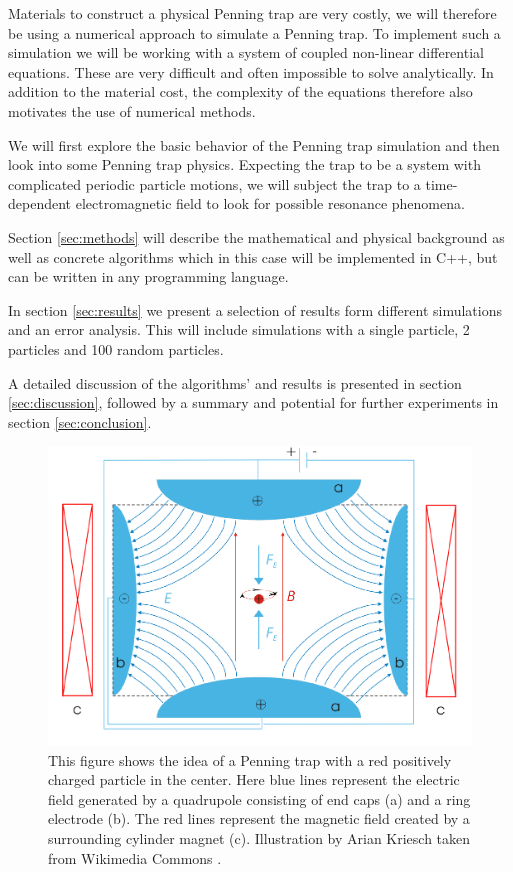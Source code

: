 \documentclass[english,notitlepage,reprint,nofootinbib]{revtex4-1}  %
\begin{document}
Materials to construct a physical Penning trap are very costly, we will therefore
be using a numerical approach to simulate a Penning trap. To implement such a simulation
we will be working with a system of coupled non-linear differential equations. These are very
difficult and often impossible to solve analytically. %
In addition to the
material cost, the complexity of the equations therefore also motivates the use of numerical methods.

We will first explore the basic behavior of the Penning trap simulation and then look into some Penning trap physics. Expecting
the trap to be a system with complicated periodic particle motions, we will subject the trap to a time-dependent electromagnetic field
to look for possible resonance phenomena.


Section \ref{sec:methods} will describe the mathematical and physical background as well as concrete algorithms which in this case will be
implemented in C++, but can be written in any programming language.

In section \ref{sec:results} we present a selection of results form different simulations and an error analysis. This will include
simulations with a single particle, 2 particles and 100 random particles.

A detailed discussion of the algorithms' and results is presented in section \ref{sec:discussion},
followed by a summary and potential for further experiments in section \ref{sec:conclusion}.

\begin{figure}[H]
    \centering
    \includegraphics[width=.5\textwidth]{../figures/Penning_trap.pdf}
    \caption{This figure shows the idea of a Penning trap with a red positively charged particle in the center.
        Here blue lines represent the electric field generated by a quadrupole consisting of end caps (a) and a ring electrode (b).
        The red lines represent the magnetic field created by a surrounding cylinder magnet (c).
        Illustration by Arian Kriesch taken from Wikimedia Commons \cite{commons}.}
    \label{fig:Penning_trap}
\end{figure}
\end{document}
